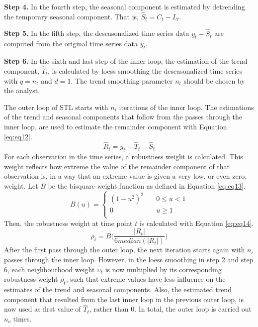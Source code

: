 \documentclass[12pt,oneside]{reedthesis}
\begin{document}
\textbf{Step 4.} In the fourth step, the seasonal component is estimated
by detrending the temporary seasonal component. That is,
\(\hat{S}_{t} = C_{t} - L_{t}\).

\textbf{Step 5.} In the fifth step, the deseasonalized time series data
\(y_{t} - \hat{S}_{t}\) are computed from the original time series data
\(y_{t}\).

\textbf{Step 6.} In the sixth and last step of the inner loop, the
estimation of the trend component, \(\hat{T}_{t}\), is calculated by
loess smoothing the deseasonalized time series with \(q = n_{t}\) and
\(d = 1\). The trend smoothing parameter \(n_{t}\) should be chosen by
the analyst.

The outer loop of STL starts with \(n_{i}\) iterations of the inner
loop. The estimations of the trend and seasonal components that follow
from the passes through the inner loop, are used to estimate the
remainder component with Equation \eqref{eq:eq12}.
\begin{equation}
\hat{R}_{t} = y_{t} - \hat{T}_{t} - \hat{S}_{t}
\label{eq:eq12}
\end{equation}
For each observation in the time series, a robustness weight is
calculated. This weight reflects how extreme the value of the remainder
component of that observation is, in a way that an extreme value is
given a very low, or even zero, weight. Let \(B\) be the bisquare weight
function as defined in Equation \eqref{eq:eq13}.
\begin{equation}
B(u) = 
    \begin{cases}
      (1 - u^{2})^{2} &\quad 0 \leq u < 1\\
      0 &\quad u \geq 1\\
    \end{cases}
\label{eq:eq13}
\end{equation}
Then, the robustness weight at time point \(t\) is calculated with
Equation \eqref{eq:eq14}.
\begin{equation}
\rho_{t} = B\Bigg(\frac{|R_{t}|}{6median(|R_{t}|)}\Bigg)
\label{eq:eq14}
\end{equation}
After the first pass through the outer loop, the next iteration starts
again with \(n_{i}\) passes through the inner loop. However, in the
loess smoothing in step 2 and step 6, each neighbourhood weight
\(\upsilon_{t}\) is now multiplied by its corresponding robustness
weight \(\rho_{t}\), such that extreme values have less influence on the
estimates of the trend and seasonal components. Also, the estimated
trend component that resulted from the last inner loop in the previous
outer loop, is now used as first value of \(\hat{T}_{t}\), rather than
\(0\). In total, the outer loop is carried out \(n_{o}\) times.
\end{document}
